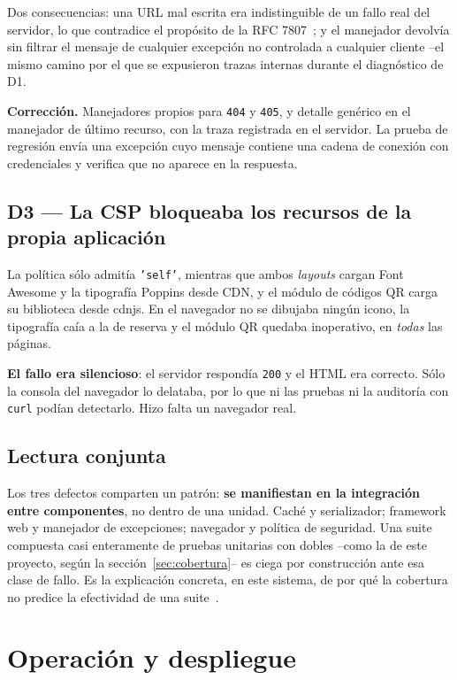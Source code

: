 \documentclass[11pt,a4paper]{article}
\begin{document}
Dos consecuencias: una URL mal escrita era indistinguible de un fallo real del
servidor, lo que contradice el propósito de la RFC 7807~\cite{rfc7807}; y el
manejador devolvía sin filtrar el mensaje de cualquier excepción no controlada a
cualquier cliente --el mismo camino por el que se expusieron trazas internas
durante el diagnóstico de D1.

\textbf{Corrección.} Manejadores propios para \texttt{404} y \texttt{405}, y
detalle genérico en el manejador de último recurso, con la traza registrada en el
servidor. La prueba de regresión envía una excepción cuyo mensaje contiene una
cadena de conexión con credenciales y verifica que no aparece en la respuesta.

\subsection{D3 --- La CSP bloqueaba los recursos de la propia aplicación}

La política sólo admitía \texttt{'self'}, mientras que ambos \emph{layouts} cargan
Font Awesome y la tipografía Poppins desde CDN, y el módulo de códigos QR carga su
biblioteca desde cdnjs. En el navegador no se dibujaba ningún icono, la tipografía
caía a la de reserva y el módulo QR quedaba inoperativo, en \emph{todas} las
páginas.

\textbf{El fallo era silencioso}: el servidor respondía \texttt{200} y el HTML era
correcto. Sólo la consola del navegador lo delataba, por lo que ni las pruebas ni
la auditoría con \texttt{curl} podían detectarlo. Hizo falta un navegador real.

\subsection{Lectura conjunta}

Los tres defectos comparten un patrón: \textbf{se manifiestan en la integración
entre componentes}, no dentro de una unidad. Caché y serializador; framework web y
manejador de excepciones; navegador y política de seguridad. Una suite compuesta
casi enteramente de pruebas unitarias con dobles --como la de este proyecto, según
la sección~\ref{sec:cobertura}-- es ciega por construcción ante esa clase de fallo.
Es la explicación concreta, en este sistema, de por qué la cobertura no predice la
efectividad de una suite~\cite{inozemtseva2014coverage}.

\section{Operación y despliegue}\label{sec:operacion}
\end{document}
